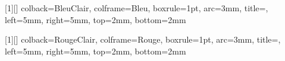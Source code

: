 [1][\unskip]{
    colback=BleuClair,
    colframe=Bleu,
    boxrule=1pt,
    arc=3mm,
    title=,
    left=5mm,
    right=5mm,
    top=2mm,
    bottom=2mm
}


[1][\unskip]{
    colback=RougeClair,
    colframe=Rouge,
    boxrule=1pt,
    arc=3mm,
    title=,
    left=5mm,
    right=5mm,
    top=2mm,
    bottom=2mm
}

\newenvironment{tableau}[1]
{%
    \renewcommand{\arraystretch}{1.3}%
    \begin{center}%
    \begin{tabularx}{\linewidth}{#1}%
    \toprule
}
{%
    \bottomrule
    \end{tabularx}%
    \end{center}%
    \renewcommand{\arraystretch}{1}%
}

